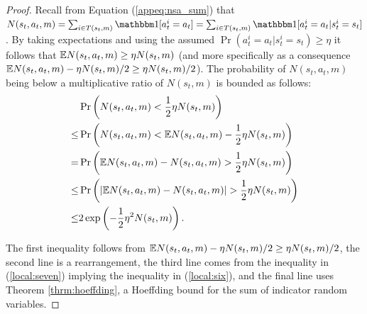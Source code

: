     \begin{proof}
        Recall from Equation (\ref{appeq:nsa_sum}) that $N(s_t,a_t,m)=\sum_{i\in T(s_t,m)} \one[a^i_t=a_t] = \sum_{i\in T(s_t,m)} \one[a^i_t=a_t | s^i_t=s_t]$ . By taking expectations  and using the assumed $\Pr(a^i_t=a_t|s^i_t=s_t)\geq\eta$ it follows that $\mathbb{E}N(s_t,a_t,m) \geq \eta N(s_t,m)$ (and more specifically as a consequence $\mathbb{E}N(s_t,a_t,m) - \eta N(s_t,m)/2 \geq \eta N(s_t,m)/2$). The probability of $N(s_t,a_t,m)$ being below a multiplicative ratio of $N(s_t,m)$ is bounded as follows:
        \begin{align}
            & \Pr\left(N(s_t,a_t,m) < \frac{1}{2}\eta N(s_t,m)\right) \\
                \leq & \Pr\left(N(s_t,a_t,m) < \mathbb{E}N(s_t,a_t,m) - \frac{1}{2}\eta N(s_t,m)\right) \\
                = & \Pr\left(\mathbb{E}N(s_t,a_t,m) - N(s_t,a_t,m) > \frac{1}{2}\eta N(s_t,m)\right) 
                    \label{local:seven} \\
                \leq & \Pr\left(|\mathbb{E}N(s_t,a_t,m) - N(s_t,a_t,m)| > \frac{1}{2}\eta N(s_t,m)\right) 
                    \label{local:six} \\
                \leq & 2\exp\left(-\frac{1}{2}\eta^2N(s_t,m)\right). \label{eq:bound_nsa}
        \end{align}
        
        The first inequality follows from $\mathbb{E}N(s_t,a_t,m) - \eta N(s_t,m)/2 \geq \eta N(s_t,m)/2$, the second line is a rearrangement, the third line comes from the inequality in (\ref{local:seven}) implying the inequality in (\ref{local:six}), and the final line uses Theorem \ref{thrm:hoeffding}, a Hoeffding bound for the sum of indicator random variables. 
        

\end{proof}
